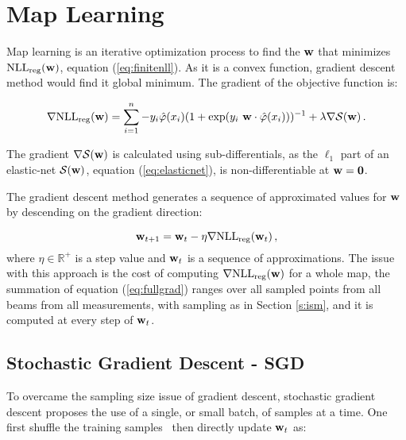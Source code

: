 
\section{Map Learning}

Map learning is an iterative optimization process to find the $\mathrm{\mathbf{w}}$ that
minimizes $\text{NLL}_{\text{reg}}(\mathrm{\mathbf{w}})$, equation (\ref{eq:finitenll}). As
it is a convex function, gradient descent method would find it global
minimum. The gradient of the objective function is:

\begin{equation}
\label{eq:fullgrad}
\nabla\text{NLL}_{\text{reg}}(\mathrm{\mathbf{w}}) =  \sum_{i=1}^n
-y_i\hat\varphi(x_i)(1+\exp(y_i~ \mathrm{\mathbf{w}}\cdot\hat\varphi(x_i)))^{-1}
+\lambda\nabla\mathcal{S}(\mathrm{\mathbf{w}})\,.
\end{equation}

The gradient $\nabla\mathcal{S}(\mathrm{\mathbf{w}})$ is calculated using
sub-differentials, as the $\ell_1$ part of an elastic-net
$\mathcal{S}(\mathrm{\mathbf{w}})$, equation (\ref{eq:elasticnet}), is non-differentiable at
$\mathrm{\mathbf{w}}=\mathbf{0}$.

The gradient descent method generates a sequence of approximated values for
$\mathrm{\mathbf{w}}$ by descending on the gradient direction:

\begin{equation}
\label{eq:gd}
\mathrm{\mathbf{w}}_{t+1}=\mathrm{\mathbf{w}}_{t}-\eta\nabla\text{NLL}_{\text{reg}}(\mathrm{\mathbf{w}}_t)\,,
\end{equation}
%
where $\eta\in\mathbb{R}^+$ is a step value and $\mathrm{\mathbf{w}}_t$ is a sequence of
approximations. The issue with this approach is the cost of computing
$\nabla\text{NLL}_{\text{reg}}(\mathrm{\mathbf{w}})$ for a whole map, the summation of
equation (\ref{eq:fullgrad}) ranges over all sampled points from all beams from
all measurements, with sampling as in Section \ref{s:ism}, and it is computed
at every step of $\mathrm{\mathbf{w}}_t$.

\subsection{Stochastic Gradient Descent - SGD}

To overcame the sampling size issue of gradient descent, stochastic gradient descent proposes the use of a single, or small batch, of samples at
a time. One first shuffle the training samples~\cite{bottou2012stochastic} then
directly update $\mathrm{\mathbf{w}}_t$ as:

